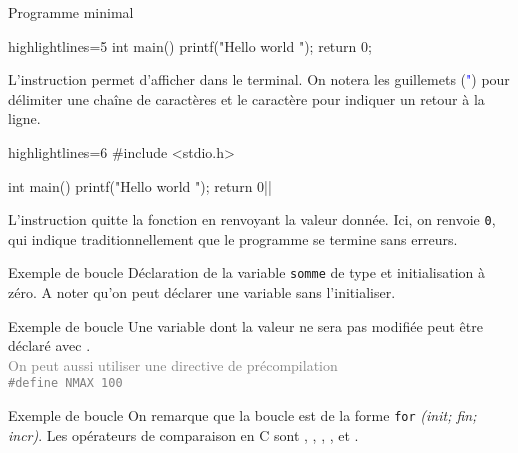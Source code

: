 \documentclass[10pt]{beamer}
\begin{document}
\begin{frame}[fragile]{\Ctitle}{\stitle}
\begin{exampleblock}{Programme minimal}
\begin{overprint}
\begin{langageC*}{highlightlines=5}
				int main()
				{
						printf("Hello world \n");
						return 0;
					}
			\end{langageC*}
			\medskip
			L'instruction  permet d'afficher dans le terminal. On notera les guillemets (\textcolor{blue}{"}) pour délimiter une chaîne de caractères et le caractère  pour indiquer un retour à la ligne.
			\onslide<7>
			\begin{langageC*}{highlightlines=6}
				#include <stdio.h>

				int main()
				{
						printf("Hello world \n");
						return 0|\myem{;}|
					}
			\end{langageC*}
			\medskip
			L'instruction  quitte la fonction en renvoyant la valeur donnée. Ici, on renvoie {\tt 0}, qui indique traditionnellement que le programme se  termine sans erreurs.
		\end{overprint}
	\end{exampleblock}

\end{frame}

\begin{frame}{\Ctitle}{\stitle}
	\begin{exampleblock}{Exemple de boucle}
		\medskip
		Déclaration de la variable {\tt somme} de type  et initialisation à zéro. A noter qu'on peut déclarer une variable sans l'initialiser.
	\end{exampleblock}
\end{frame}

\begin{frame}{\Ctitle}{\stitle}
	\begin{exampleblock}{Exemple de boucle}
		\medskip
		Une variable dont la valeur ne sera pas modifiée peut être déclaré avec .\\
		\onslide<2-> \textcolor{gray}{On peut aussi utiliser une directive de précompilation \\ {\tt \#define NMAX 100}}
	\end{exampleblock}
\end{frame}

\begin{frame}{\Ctitle}{\stitle}
	\begin{exampleblock}{Exemple de boucle}
		\medskip
		On remarque que la boucle  est de la forme {\tt for} \textit{(init; fin; incr)}. Les opérateurs de comparaison en C sont \kw{==}, \kw{!=}, \kw{<}, \kw{>}, \kw{<=} et \kw{>=}.
	\end{exampleblock}
\end{frame}
\end{document}
